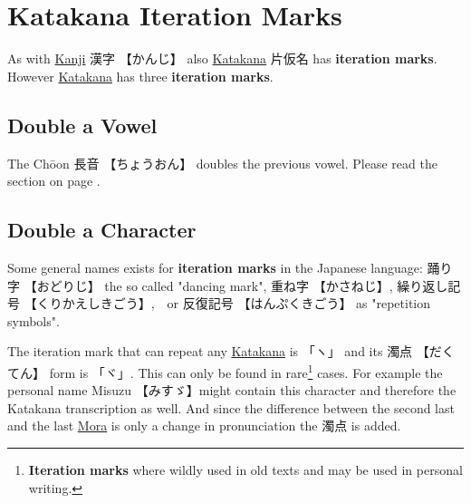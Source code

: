 \section{Katakana Iteration Marks} \label{sec:Iteration}

As with \hyperref[sec:Kanji]{Kanji} {漢字} {【かんじ】} also
\hyperref[sec:Katakana]{Katakana} {片仮名} has \textbf{iteration marks}.
However \hyperref[sec:Katakana]{Katakana} has three \textbf{iteration marks}. 

\subsection{Double a Vowel}\label{subsec:Choon}


The Chōon {長音} {【ちょうおん】} doubles the previous vowel. Please read the
section  on page \pageref{subsec:DoublingVowel}.

\subsection{Double a Character}
 
\ifor{}{}{}{}

Some general names exists for \textbf{iteration marks} in the Japanese
language: {踊り字} {【おどりじ】} the so called  "dancing mark", {重ね字}
{【かさねじ】}, {繰り返し記号} {【くりかえしきごう】},　or {反復記号}
{【はんぷくきごう】} as "repetition symbols".

The iteration mark that can repeat any \hyperref[sec:Katakana]{Katakana} is
{「ヽ」}  and its {濁点} {【だくてん】} form is {「ヾ」}. This can only be
found in rare\footnote{\textbf{Iteration marks} where wildly used in old texts
and may be used in personal writing.} cases. For example the personal name
Misuzu 【みすゞ】might contain this character and therefore the Katakana
transcription as well. And since the difference between the second last and
the last \hyperref[sec:Mora]{Mora} is only a change in pronunciation the {濁点}
is added.

